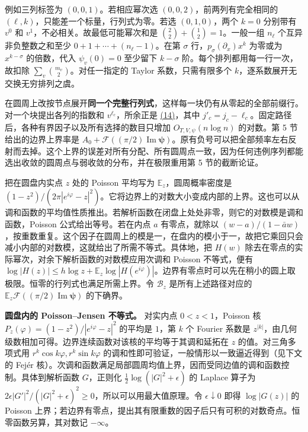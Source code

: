 \documentclass[11pt,a4paper]{article}
\begin{document}
例如三列标签为 \((0,0,1)\)。若相应幂次选 \((0,0,2)\)，前两列有完全相同的 \((\ell,k)\)，只能差一个标量，行列式为零。若选 \((0,1,0)\)，两个 \(k=0\) 分别带有 \(v^0\) 和 \(v^1\)，不必相关。故最低可能幂次和是 \(\binom22+\binom12=1\)。一般一组 \(n_\ell\) 个互异非负整数之和至少 \(0+1+\cdots+(n_\ell-1)\)。在第 \(\sigma\) 行，\(p_\sigma(\partial_x)x^k\) 为零或为 \(x^{k-\sigma}\) 的倍数，代入 \(\psi_v(0)=0\) 至少留下 \(k-\sigma\) 阶。每个排列都用每一行一次，故扣除 \(\sum_v\binom{m_v}{2}\)。对任一指定的 Taylor 系数，只需有限多个 \(k\)，逐系数展开无交换无穷排列之虞。

在圆周上改按节点展开\textbf{同一个完整行列式}，这样每一块仍有从零起的全部前缀行。对一个块提出各列的指数和 \(v^{\ell_c}\)，所余正是 \hyperref[eq:14]{(14)}，其中 \(j'_c=j_c-\ell_c\)。固定路径后，各种有界因子以及所有选择的数目只增加 \(O_{T,V,\psi}(n\log n)\) 的对数。第 5 节给出的边界上界率是 \(A_0+\mathcal F((\pi/2)\operatorname{Im}\boldsymbol\psi)\)。原有负号可以把全部频率左右反射而去掉。这个上界的误差对所有分配、所有圆周点一致，因为任何违例序列都能选出收敛的圆周点与弱收敛的分布，并在极限重用第 5 节的截断论证。

把在圆盘内实点 \(z\) 处的 Poisson 平均写为 \(\mathbb E_z\)，圆周概率密度是 \((1-z^2)/(2\pi|e^{i\varphi}-z|^2)\)。它将边界上的对数大小变成内部的上界。这也可以从调和函数的平均值性质推出。若解析函数在闭盘上处处非零，则它的对数模是调和函数，Poisson 公式给出等号。若在内点 \(a\) 有零点，就除以 \((w-a)/(1-\bar a w)\)，按重数重复。这个因子在圆周上的模是一，在盘内的模小于一，故把它乘回只会减小内部的对数模，这就给出了所需不等式。具体地，把 \(H(w)\) 除去在零点的实际幂次，对余下解析函数的对数模应用次调和 Poisson 不等式，便有 \(\log|H(z)|\le h\log z+\mathbb E_z\log|H(e^{i\varphi})|\)。边界有零点时可以先在稍小的圆上取极限。恒零的行列式也满足所需上界。令 \(\mathcal B_z\) 是所有上述路径对应的 \(\mathbb E_z\mathcal F((\pi/2)\operatorname{Im}\boldsymbol\psi)\) 的下确界。

\textbf{圆盘内的 Poisson--Jensen 不等式。} 对实内点 \(0<z<1\)，Poisson 核 \(P_z(\varphi)=(1-z^2)/|e^{i\varphi}-z|^2\) 的平均是 \(1\)，第 \(k\) 个 Fourier 系数是 \(z^{|k|}\)，由几何级数相加可得。边界连续函数对该核的平均等于其调和延拓在 \(z\) 的值。对三角多项式用 \(r^k\cos k\varphi,r^k\sin k\varphi\) 的调和性即可验证，一般情形以一致逼近得到（见下文的 Fejér 核）。次调和函数满足局部圆周均值上界，因而受同边值的调和函数控制。具体到解析函数 \(G\)，正则化 \(\tfrac12\log(|G|^2+\epsilon)\) 的 Laplace 算子为 \(2\epsilon|G'|^2/(|G|^2+\epsilon)^2\ge0\)，所以可以用最大值原理。令 \(\epsilon\downarrow0\) 即得 \(\log|G(z)|\) 的 Poisson 上界；若边界有零点，提出其有限重数的因子后只有可积的对数奇点。恒零函数另算，其对数记 \(-\infty\)。
\end{document}
